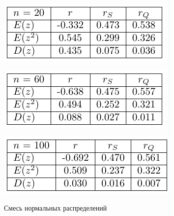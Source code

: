 \documentclass[a4paper]{article}
\begin{document}
\begin{table}[H]
    \begin{center}
    \includegraphics[]{LabSrcs/resources/mixedDistr20.pdf}
    \end{center}
    \begin{center}
    \includegraphics[]{LabSrcs/resources/mixedDistr60.pdf}
    \end{center}
    \begin{center}
    \includegraphics[]{LabSrcs/resources/mixedDistr100.pdf}
    \end{center}
    \caption{Смесь нормальных распределений}
    \label{tab:mixture}
\end{table}
\end{document}
